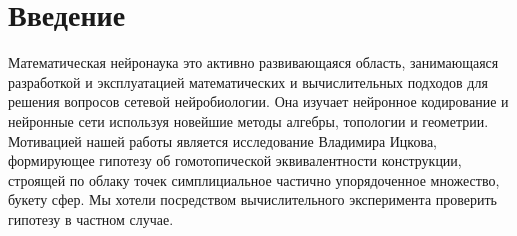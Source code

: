 \section{Введение}
Математическая нейронаука это активно развивающаяся область, занимающаяся разработкой и эксплуатацией математических и вычислительных подходов для решения вопросов сетевой нейробиологии. Она изучает нейронное кодирование и нейронные сети используя новейшие методы алгебры, топологии и геометрии. Мотивацией нашей работы является исследование Владимира Ицкова, формирующее гипотезу об гомотопической эквивалентности конструкции, строящей по облаку точек симплициальное частично упорядоченное множество, букету сфер. Мы хотели посредством вычислительного эксперимента проверить гипотезу в частном случае.